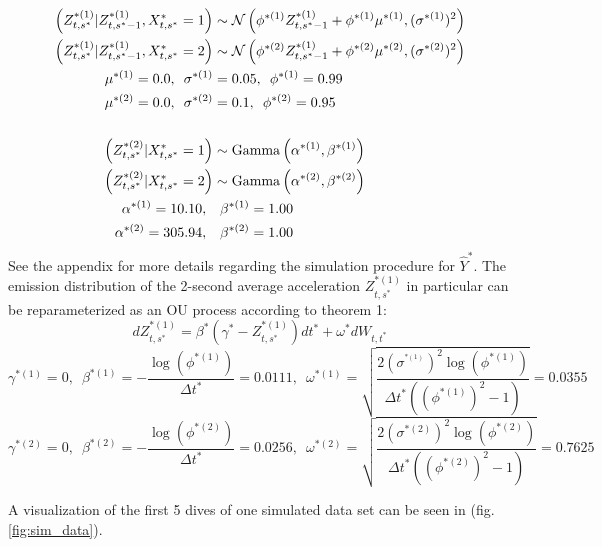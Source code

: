 \begin{align*}
    \left(Z^{*(1)}_{t,s^*} | Z^{*(1)}_{t,s^*-1}, X^*_{t,s^*} = 1 \right) &\sim \mathcal{N} \left(\phi^{*(1)}Z^{*(1)}_{t,s^*-1} + \phi^{*(1)}\mu^{*(1)}, (\sigma^{*(1)})^2 \right) \\
    \left(Z^{*(1)}_{t,s^*} | Z^{*(1)}_{t,s^*-1}, X^*_{t,s^*} = 2 \right) &\sim \mathcal{N} \left(\phi^{*(2)}Z^{*(1)}_{t,s^*-1} + \phi^{*(2)}\mu^{*(2)}, (\sigma^{*(2)})^2 \right) \\
    \mu^{*(1)} = 0.0,\enspace \sigma^{*(1)} &= 0.05,\enspace \phi^{*(1)} = 0.99 \\
    \mu^{*(2)} = 0.0,\enspace \sigma^{*(2)} &= 0.1,\enspace \phi^{*(2)} = 0.95 \\\\
    \left(Z^{*(2)}_{t,s^*} | X^*_{t,s^*} = 1\right) &\sim {\rm{Gamma}}\left(\alpha^{*(1)}, \beta^{*(1)} \right) \\
    \left(Z^{*(2)}_{t,s^*} | X^*_{t,s^*} = 2\right) &\sim {\rm{Gamma}}\left(\alpha^{*(2)}, \beta^{*(2)} \right) \\
    \alpha^{*(1)} = 10.10, \enspace & \enspace \beta^{*(1)} = 1.00 \\
    \alpha^{*(2)} = 305.94, \enspace & \enspace \beta^{*(2)} = 1.00
\end{align*}
%
See the appendix for more details regarding the simulation procedure for $\hat Y^*$. The emission distribution of the 2-second average acceleration $Z_{t,s^*}^{*(1)}$ in particular can be reparameterized as an OU process according to theorem 1:
%
$$dZ^{*(1)}_{t,s^*} = \beta^*(\gamma^* - Z^{*(1)}_{t,s^*})dt^* + \omega^* dW_{t,t^*}$$
%
$$\gamma^{*(1)} = 0, \enspace \beta^{*(1)} = -\frac{\log(\phi^{*(1)})}{\Delta t^*} = 0.0111, \enspace \omega^{*(1)} = \sqrt{\frac{2(\sigma^{^{*(1)}})^2\log(\phi^{*(1)})}{\Delta t^* ((\phi^{*(1)})^2-1)}} = 0.0355$$
$$\gamma^{*(2)} = 0, \enspace \beta^{*(2)} = -\frac{\log(\phi^{*(2)})}{\Delta t^*} = 0.0256, \enspace \omega^{*(2)} = \sqrt{\frac{2(\sigma^{*(2)})^2\log(\phi^{*(2)})}{\Delta t^* ((\phi^{*(2)})^2-1)}} = 0.7625$$

A visualization of the first 5 dives of one simulated data set can be seen in (fig. \ref{fig:sim_data}).

